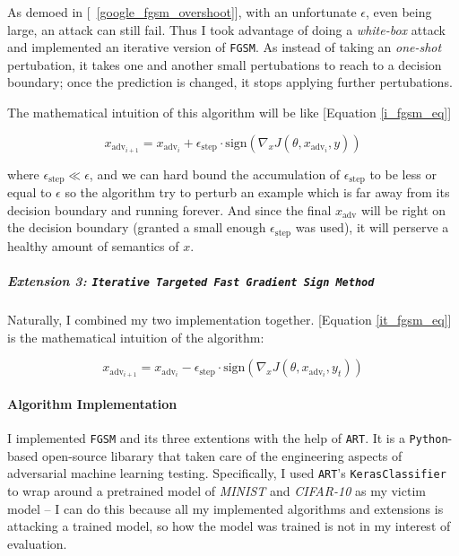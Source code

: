 \documentclass[11pt]{article}
\newcommand{\ilc}{\texttt}
\begin{document}
As demoed in [\figurename{\ \ref{google_fgsm_overshoot}}], with an unfortunate $\epsilon$, even being large, an attack can still fail. Thus I took advantage of doing a \textit{white-box} attack and implemented an iterative version of \ilc{FGSM}. As instead of taking an \textit{one-shot} pertubation, it takes one and another small pertubations to reach to a decision boundary; once the prediction is changed, it stops applying further pertubations.

The mathematical intuition of this algorithm will be like [Equation \ref{i_fgsm_eq}]

\begin{equation}
    x_{\text{adv}_{i+1}} = x_{\text{adv}_{i}} + \epsilon_{\text{step}} \cdot \text{sign}(\nabla_x J(\theta, x_{\text{adv}_{i}}, y))
    \label{i_fgsm_eq}
\end{equation}

where $\epsilon_{\text{step}} \ll \epsilon$, and we can hard bound the accumulation of $\epsilon_{\text{step}}$ to be less or equal to $\epsilon$ so the algorithm try to perturb an example which is far away from its decision boundary and running forever. And since the final $x_{\text{adv}} $ will be right on the decision boundary (granted a small enough $\epsilon_{\text{step}}$ was used), it will perserve a healthy amount of semantics of $x$.

\subparagraph{Extension 3: \ilc{Iterative Targeted Fast Gradient Sign Method}}

Naturally, I combined my two implementation together. [Equation \ref{it_fgsm_eq}] is the mathematical intuition of the algorithm:

\begin{equation}
    x_{\text{adv}_{i+1}} = x_{\text{adv}_{i}} - \epsilon_{\text{step}} \cdot \text{sign}(\nabla_x J(\theta, x_{\text{adv}_{i}}, y_t))
    \label{it_fgsm_eq}
\end{equation}

\paragraph{Algorithm Implementation}

I implemented \ilc{FGSM} and its three extentions with the help of \ilc{ART}\cite{cite:art}. It is a \ilc{Python}-based open-source libarary that taken care of the engineering aspects of adversarial machine learning testing. Specifically, I used \ilc{ART}'s \ilc{KerasClassifier} to wrap around a pretrained model of \textit{MINIST} and \textit{CIFAR-10} as my victim model -- I can do this because all my implemented algorithms and extensions is attacking a trained model, so how the model was trained is not in my interest of evaluation.\newline
\end{document}
